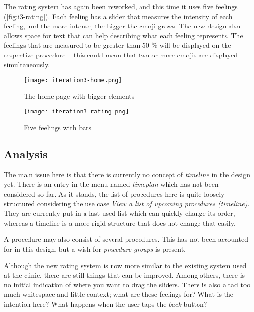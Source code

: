 The rating system has again been reworked, and this time it uses five feelings (\autoref{fig:i3-rating}). Each feeling has a slider that measures the intensity of each feeling, and the more intense, the bigger the emoji grows. The new design also allows space for text that can help describing what each feeling represents. The feelings that are measured to be greater than 50 \% will be displayed on the respective procedure -- this could mean that two or more emojis are displayed simultaneously.

\begin{figure}
    \centering
    \begin{minipage}{0.45\textwidth}
        \centering
        \texttt{[image: iteration3-home.png]}
        \caption{The home page with bigger elements}
        \label{fig:i3-home}
    \end{minipage}
    \begin{minipage}{0.45\textwidth}
        \centering
        \texttt{[image: iteration3-rating.png]}
        \caption{Five feelings with bars}
        \label{fig:i3-rating}
    \end{minipage}
\end{figure}

\subsection{Analysis}

The main issue here is that there is currently no concept of \emph{timeline} in the design yet. There is an entry in the menu named \emph{timeplan} which has not been considered so far. As it stands, the list of procedures here is quite loosely structured considering the use case \emph{View a list of upcoming procedures (timeline)}. They are currently put in a last used list which can quickly change its order, whereas a timeline is a more rigid structure that does not change that easily.

A procedure may also consist of several procedures. This has not been accounted for in this design, but a wish for \emph{procedure groups} is present.

Although the new rating system is now more similar to the existing system used at the clinic, there are still things that can be improved. Among others, there is no initial indication of where you want to drag the sliders. There is also a tad too much whitespace and little context; what are these feelings for? What is the intention here? What happens when the user taps the \emph{back} button?

